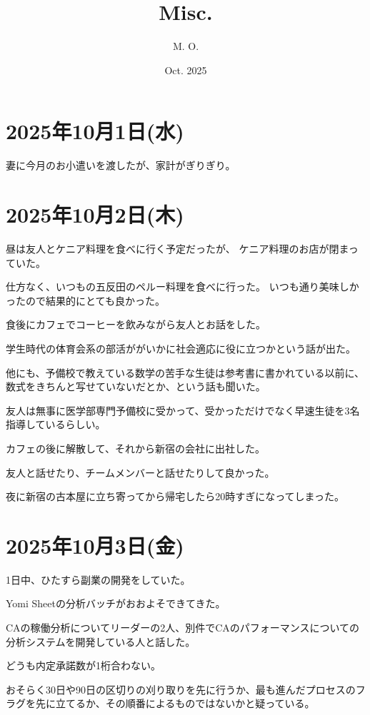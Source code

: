 \documentclass[uplatex]{jsarticle}
\title{
Misc.
}
\author{
M. O.
}
\date{Oct. 2025}
\begin{document}
\maketitle

\section{2025年10月1日(水)}

妻に今月のお小遣いを渡したが、家計がぎりぎり。



\section{2025年10月2日(木)}

昼は友人とケニア料理を食べに行く予定だったが、
ケニア料理のお店が閉まっていた。

仕方なく、いつもの五反田のペルー料理を食べに行った。
いつも通り美味しかったので結果的にとても良かった。

食後にカフェでコーヒーを飲みながら友人とお話をした。

学生時代の体育会系の部活ががいかに社会適応に役に立つかという話が出た。

他にも、予備校で教えている数学の苦手な生徒は参考書に書かれている以前に、数式をきちんと写せていないだとか、という話も聞いた。

友人は無事に医学部専門予備校に受かって、受かっただけでなく早速生徒を3名指導しているらしい。

カフェの後に解散して、それから新宿の会社に出社した。

友人と話せたり、チームメンバーと話せたりして良かった。

夜に新宿の古本屋に立ち寄ってから帰宅したら20時すぎになってしまった。



\section{2025年10月3日(金)}

1日中、ひたすら副業の開発をしていた。

Yomi Sheetの分析バッチがおおよそできてきた。

CAの稼働分析についてリーダーの2人、別件でCAのパフォーマンスについての分析システムを開発している人と話した。

どうも内定承諾数が1桁合わない。

おそらく30日や90日の区切りの刈り取りを先に行うか、最も進んだプロセスのフラグを先に立てるか、その順番によるものではないかと疑っている。
\end{document}
